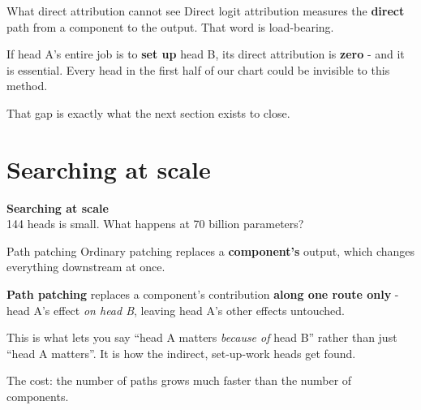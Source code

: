 \documentclass[aspectratio=169]{beamer}
\newcommand{\keybox}[1]{%
  \begin{tcolorbox}[colback=armblue!8, colframe=armblue, boxrule=0.6pt, arc=2pt]
  #1
  \end{tcolorbox}}
\newcommand{\trapbox}[1]{%
  \begin{tcolorbox}[colback=armred!8, colframe=armred, boxrule=0.6pt, arc=2pt]
  #1
  \end{tcolorbox}}
\newcommand{\sectiontransition}[2]{%
  \begin{frame}[plain]
    \vfill
    \begin{center}
      {\Huge\bfseries\color{popblue} #1}\\[1.1em]
      {\large #2}
    \end{center}
    \vfill
  \end{frame}}
\begin{document}
\begin{frame}{What direct attribution cannot see}
  \vspace{0.8em}
  Direct logit attribution measures the \textbf{direct} path from a component to the output. That
  word is load-bearing.

  \vspace{0.9em}
  \begin{center}
  \end{center}

  \vspace{0.9em}
  \trapbox{If head A's entire job is to \textbf{set up} head B, its direct attribution is
  \textbf{zero} - and it is essential. Every head in the first half of our chart could be
  invisible to this method.}

  \vspace{0.5em}
  That gap is exactly what the next section exists to close.
\end{frame}

\section{Searching at scale}
\sectiontransition{Searching at scale}{144 heads is small. What happens at 70 billion parameters?}

\begin{frame}{Path patching}
  \vspace{0.8em}
  Ordinary patching replaces a \textbf{component's} output, which changes everything downstream
  at once.

  \vspace{0.7em}
  \textbf{Path patching} replaces a component's contribution \textbf{along one route only} -
  head A's effect \emph{on head B}, leaving head A's other effects untouched.

  \vspace{1.0em}
  \keybox{This is what lets you say ``head A matters \emph{because of} head B'' rather than just
  ``head A matters''. It is how the indirect, set-up-work heads get found.}

  \vspace{0.8em}
  The cost: the number of paths grows much faster than the number of components.
\end{frame}
\end{document}
